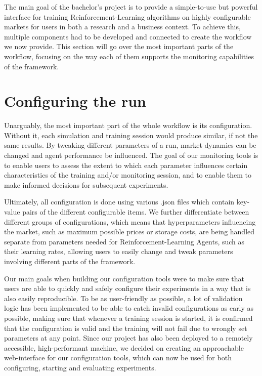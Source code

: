 \label{ch:OurWorkflow}

\begin{jointwork}
	The main goal of the bachelor's project is to provide a simple-to-use but powerful interface for training Reinforcement-Learning algorithms on highly configurable markets for users in both a research and a business context. To achieve this, multiple components had to be developed and connected to create the workflow we now provide. This section will go over the most important parts of the workflow, focusing on the way each of them supports the monitoring capabilities of the framework.
\end{jointwork}

\section{Configuring the run}

Unarguably, the most important part of the whole workflow is its configuration. Without it, each simulation and training session would produce similar, if not the same results. By tweaking different parameters of a run, market dynamics can be changed and agent performance be influenced. The goal of our monitoring tools is to enable users to assess the extent to which each parameter influences certain characteristics of the training and/or monitoring session, and to enable them to make informed decisions for subsequent experiments.

Ultimately, all configuration is done using various .json files which contain key-value pairs of the different configurable items. We further differentiate between different groups of configurations, which means that hyperparameters influencing the market, such as maximum possible prices or storage costs, are being handled separate from parameters needed for Reinforcement-Learning Agents, such as their learning rates, allowing users to easily change and tweak parameters involving different parts of the framework.

Our main goals when building our configuration tools were to make sure that users are able to quickly and safely configure their experiments in a way that is also easily reproducible. To be as user-friendly as possible, a lot of validation logic has been implemented to be able to catch invalid configurations as early as possible, making sure that whenever a training session is started, it is confirmed that the configuration is valid and the training will not fail due to wrongly set parameters at any point. Since our project has also been deployed to a remotely accessible, high-performant machine, we decided on creating an approachable web-interface for our configuration tools, which can now be used for both configuring, starting and evaluating experiments.

